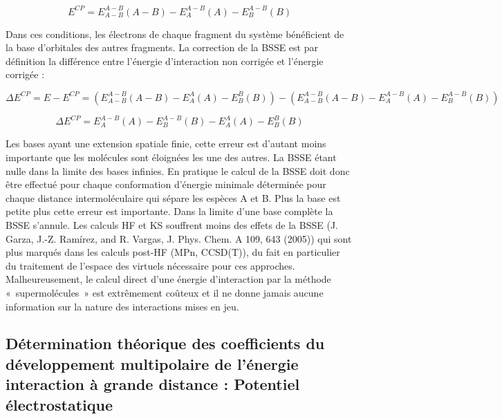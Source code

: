\begin{equation}
E^{CP} = E_{A-B}^{A-B}(A-B) - E_{A}^{A-B}(A) - E_{B}^{A-B}(B)
\end{equation}

Dans ces conditions, les électrons de chaque fragment du système bénéficient de la base d'orbitales des autres fragments. La correction de la BSSE est par définition la différence entre l'énergie d'interaction non corrigée et l'énergie corrigée :

\begin{equation}
\Delta E^{CP} = E - E^{CP} = (E_{A-B}^{A-B}(A-B) - E_{A}^{A}(A) - E_{B}^{B}(B)) - (E_{A-B}^{A-B}(A-B) - E_{A}^{A-B}(A) - E_{B}^{A-B}(B))
\end{equation}

\begin{equation}
\Delta E^{CP} =  E_{A}^{A-B}(A) - E_{B}^{A-B}(B) - E_{A}^{A}(A) - E_{B}^{B}(B)
\end{equation}

Les bases ayant une extension spatiale finie, cette erreur est d'autant moins importante que les molécules sont éloignées les une des autres. La BSSE étant nulle dans la limite des bases infinies. En pratique le calcul de la BSSE doit donc être effectué pour chaque conformation d’énergie minimale déterminée pour chaque distance intermoléculaire qui sépare les espèces A et B. Plus la base est petite plus cette erreur est importante. Dans la limite d’une base complète la BSSE s’annule.
Les calculs HF et KS souffrent moins des effets de la BSSE (J. Garza, J.-Z. Ramírez, and R. Vargas, J. Phys. Chem. A 109, 643 (2005))
qui sont plus marqués dans les calculs post-HF (MPn, CCSD(T)), du fait en particulier du traitement de l’espace des virtuels nécessaire pour ces approches.\\


Malheureusement, le calcul direct d’une énergie d’interaction par la méthode « supermolécules » est extrêmement coûteux et il ne donne jamais aucune information sur la nature des interactions mises en jeu.\\

\subsection{Détermination théorique des coefficients du développement multipolaire de l’énergie interaction à grande distance : Potentiel électrostatique}


